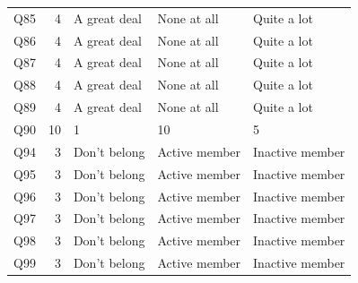 \begin{longtable}{l r l l l}
Q85 & 4 & A great deal & None at all & Quite a lot \\
Q86 & 4 & A great deal & None at all & Quite a lot \\
Q87 & 4 & A great deal & None at all & Quite a lot \\
Q88 & 4 & A great deal & None at all & Quite a lot \\
Q89 & 4 & A great deal & None at all & Quite a lot \\
Q90 & 10 & 1 & 10 & 5 \\
Q94 & 3 & Don't belong & Active member & Inactive member \\
Q95 & 3 & Don't belong & Active member & Inactive member \\
Q96 & 3 & Don't belong & Active member & Inactive member \\
Q97 & 3 & Don't belong & Active member & Inactive member \\
Q98 & 3 & Don't belong & Active member & Inactive member \\
Q99 & 3 & Don't belong & Active member & Inactive member \\
\end{longtable}
\endgroup
